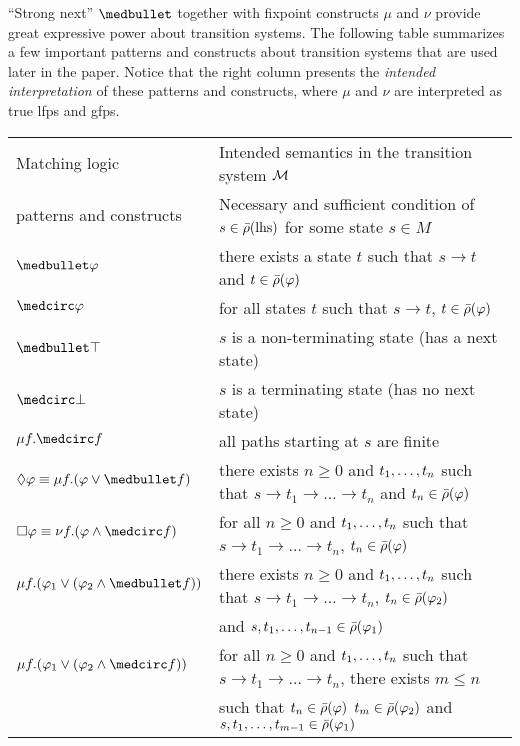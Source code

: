 \documentclass{amsart}
\begin{document}

``Strong next'' $\snext$ together with fixpoint constructs $\mu$ and $\nu$
provide great expressive power about transition systems.
The following table summarizes a few important patterns and constructs about transition systems
that are used later in the paper.
Notice that the right column presents the \emph{intended interpretation} of these
patterns and constructs, where $\mu$ and $\nu$ are interpreted as true lfps and gfps.
\begin{center}
\small
\begin{tabular}{ll}
Matching logic          &  Intended semantics in the transition system $\mathcal{M}$ \\
patterns and constructs &  Necessary and sufficient condition of $s \in \bar{\rho}(\text{lhs})$
                           for some state $s \in M$
\\\hline
$\snext \varphi$ &
there exists a state $t$ such that $s \to t$ and $t \in \bar{\rho}(\varphi)$
\\
$\wnext \varphi$ &
for all states $t$ such that $s \to t$, $t \in \bar{\rho}(\varphi)$
\\
$\snext \top$ &
$s$ is a non-terminating state (has a next state)
\\
$\wnext \bot$ &
$s$ is a terminating state (has no next state)
\\
$\mu f . \wnext f$ &
all paths starting at $s$ are finite 
\\
$\eventually \varphi \equiv \mu f . (\varphi \vee \snext f)$ &
there exists $n \ge 0$ and $t_1 ,\dots, t_n$ such that 
$s \to t_1 \to \dots \to t_n$ and $t_n \in \bar{\rho}(\varphi)$
\\
$\always \varphi \equiv \nu f . (\varphi \wedge \wnext f)$ &
for all $n \ge 0$ and $t_1 ,\dots, t_n$ such that
$s \to t_1 \to \dots \to t_n$, $t_n \in \bar{\rho}(\varphi)$
\\
$\mu f . (\varphi_1 \vee (\varphi_2 \wedge \snext f))$ &
there exists $n \ge 0$ and $t_1 ,\dots, t_n$ such that 
$s \to t_1 \to \dots \to t_n$, 
$t_n \in \bar{\rho}(\varphi_2)$
\\& and $s,t_1 ,\dots, t_{n-1} \in \bar{\rho}(\varphi_1)$
\\
$\mu f . (\varphi_1 \vee (\varphi_2 \wedge \wnext f))$ &
for all $n \ge 0$ and $t_1 ,\dots, t_n$ such that
$s \to t_1 \to \dots \to t_n$, 
there exists $m \le n$ 
\\&such that $t_n \in \bar{\rho}(\varphi)$
$t_m \in \bar{\rho}(\varphi_2)$ and $s,t_1 ,\dots, t_{m-1} \in \bar{\rho}(\varphi_1)$
\end{tabular}
\end{center}
\end{document}

